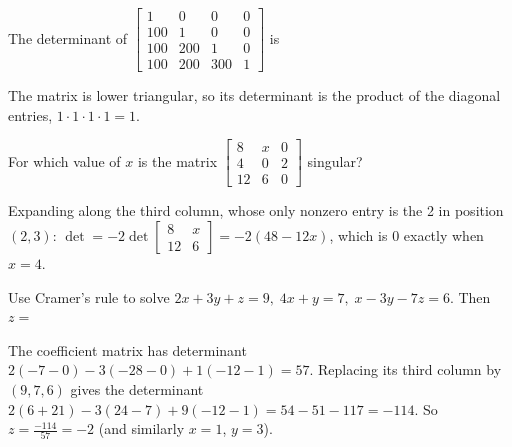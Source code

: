 \begin{question}[id=gate-ee2002-1, source=GATE EE 2002]
The determinant of $\begin{bmatrix} 1 & 0 & 0 & 0 \\ 100 & 1 & 0 & 0 \\ 100 & 200 & 1 & 0 \\ 100 & 200 & 300 & 1 \end{bmatrix}$ is
\begin{options}
\end{options}
\begin{solution}
The matrix is lower triangular, so its determinant is the product of the diagonal entries, $1 \cdot 1 \cdot 1 \cdot 1 = 1$.
\end{solution}
\end{question}

\begin{question}[id=gate-me2004-1, source=GATE ME 2004]
For which value of $x$ is the matrix $\begin{bmatrix} 8 & x & 0 \\ 4 & 0 & 2 \\ 12 & 6 & 0 \end{bmatrix}$ singular?
\begin{options}
\end{options}
\begin{solution}
Expanding along the third column, whose only nonzero entry is the 2 in position $(2, 3)$: $\det = -2\det\begin{bmatrix} 8 & x \\ 12 & 6 \end{bmatrix} = -2(48 - 12x)$, which is 0 exactly when $x = 4$.
\end{solution}
\end{question}

\begin{question}[id=gate-me1995-1, source=GATE ME 1995 (adapted), marks=2]
Use Cramer's rule to solve $2x + 3y + z = 9,\; 4x + y = 7,\; x - 3y - 7z = 6$. Then $z =$
\begin{solution}
The coefficient matrix has determinant $2(-7 - 0) - 3(-28 - 0) + 1(-12 - 1) = 57$. Replacing its third column by $(9, 7, 6)$ gives the determinant $2(6 + 21) - 3(24 - 7) + 9(-12 - 1) = 54 - 51 - 117 = -114$. So $z = \frac{-114}{57} = -2$ (and similarly $x = 1$, $y = 3$).
\end{solution}
\end{question}

